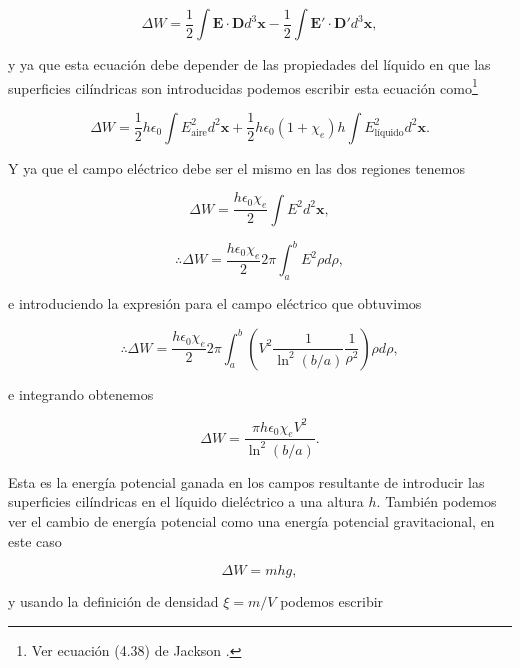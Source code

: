 \documentclass[a4paper,11pt]{article}
\numberwithin{equation}{section}
\begin{document}
\begin{equation}
 \Delta W = \frac{1}{2}\int \mathbf{E}\cdot \mathbf{D} d^3 \mathbf{x} - 
 \frac{1}{2}\int \mathbf{E}'\cdot \mathbf{D}' d^3 \mathbf{x},
\end{equation}

y ya que esta ecuación debe depender de las propiedades del líquido en que 
las superficies cilíndricas son introducidas podemos escribir esta ecuación 
como\footnote{Ver ecuación (4.38) de Jackson \cite{jackson}.}

\begin{equation}
 \Delta W = \frac{1}{2}h\epsilon_0 \int E_{\text{aire}}^2 d^2 \mathbf{x} +
 \frac{1}{2}h\epsilon_0(1 + \chi_e)h \int E_{\text{líquido}}^2 d^2 \mathbf{x}.
\end{equation}

Y ya que el campo eléctrico debe ser el mismo en las dos regiones tenemos 

\begin{equation}
 \Delta W = \frac{h\epsilon_0 \chi_e}{2}\int E^2 d^2\mathbf{x},
\end{equation}

\begin{equation}
 \therefore \Delta W = \frac{h\epsilon_0 \chi_e}{2}2\pi \int_a^b E^2 \rho d\rho,
\end{equation}

e introduciendo la expresión para el campo eléctrico que obtuvimos 

\begin{equation}
 \therefore \Delta W = \frac{h\epsilon_0 \chi_e}{2}2\pi \int_a^b 
 \left(V^2 \frac{1}{\ln^2{(b/a)}}\frac{1}{\rho^2} \right)\rho d\rho,
\end{equation}

e integrando obtenemos 

\begin{equation}
  \Delta W = \frac{\pi h \epsilon_0 \chi_e V^2}{\ln^2{(b/a)}}.
\end{equation}

Esta es la energía potencial ganada en los campos resultante de introducir las 
superficies cilíndricas en el líquido dieléctrico a una altura $h$. También podemos 
ver el cambio de energía potencial como una energía potencial gravitacional, en 
este caso 

\begin{equation}
 \Delta W = mhg,
\end{equation}

y usando la definición de densidad $\xi = m/V$ podemos escribir 
\end{document}
